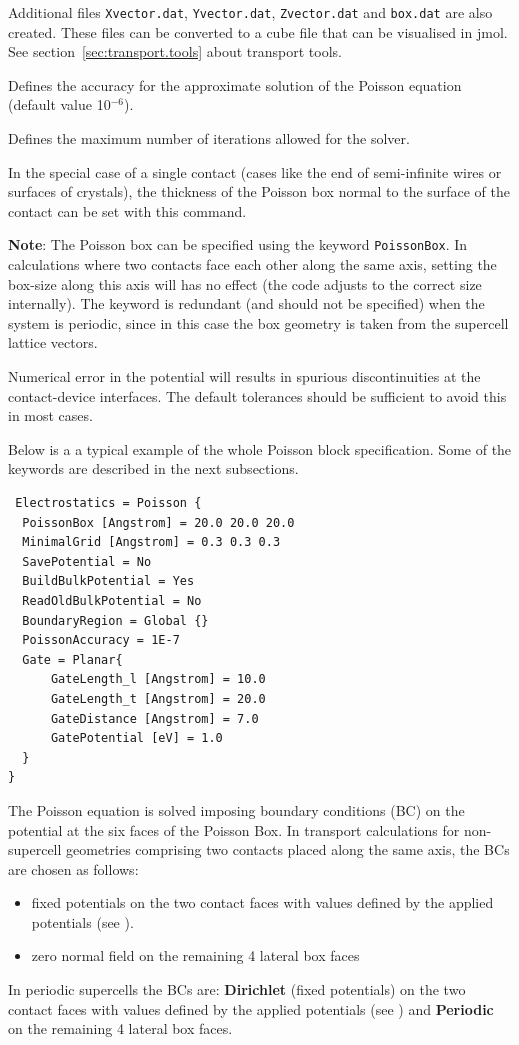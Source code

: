 \begin{description}
  Additional files \verb|Xvector.dat|, \verb|Yvector.dat|, \verb|Zvector.dat|
  and \verb|box.dat| are also created. These files can be converted to a cube
  file that can be visualised in jmol. See section~\ref{sec:transport.tools}
  about transport tools.
\item[\is{PoissonAccuracy}] Defines the accuracy for the approximate solution of
  the Poisson equation (default value 10$^{-6}$).
\item[\is{MaxPoissonIterations}] Defines the maximum number of iterations allowed
  for the solver.
\item[\is{PoissonThickness}] In the special case of a single contact (cases like
  the end of semi-infinite wires or surfaces of crystals), the thickness of the
  Poisson box normal to the surface of the contact can be set with this command.
\end{description}

{\bf Note}: The Poisson box can be specified using the keyword
\verb|PoissonBox|. In calculations where two contacts face each other along the
same axis, setting the box-size along this axis will has no effect (the code
adjusts to the correct size internally). The  keyword is
redundant (and should not be specified) when the system is periodic, since in
this case the box geometry is taken from the supercell lattice vectors.

Numerical error in the potential will results in spurious discontinuities at the
contact-device interfaces. The default tolerances should be sufficient to avoid
this in most cases.

Below is a a typical example of the whole Poisson block specification. Some of
the keywords are described in the next subsections.
\begin{verbatim}
 Electrostatics = Poisson {
  PoissonBox [Angstrom] = 20.0 20.0 20.0
  MinimalGrid [Angstrom] = 0.3 0.3 0.3
  SavePotential = No
  BuildBulkPotential = Yes
  ReadOldBulkPotential = No
  BoundaryRegion = Global {}
  PoissonAccuracy = 1E-7
  Gate = Planar{
      GateLength_l [Angstrom] = 10.0
      GateLength_t [Angstrom] = 20.0
      GateDistance [Angstrom] = 7.0
      GatePotential [eV] = 1.0
  }
}
\end{verbatim}


The Poisson equation is solved imposing boundary conditions (BC) on the
potential at the six faces of the Poisson Box. In transport calculations for
non-supercell geometries comprising two contacts placed along the same axis, the
BCs are chosen as follows:
\begin{itemize}
\item[Dirichlet] fixed potentials on the two contact faces with values defined
  by the applied potentials (see ).
\item[Neumann] zero normal field on the remaining 4 lateral box faces
\end{itemize}
In periodic supercells the BCs are: {\bf Dirichlet} (fixed potentials) on the
two contact faces with values defined by the applied potentials (see
) and {\bf Periodic} on the remaining 4 lateral box faces.

